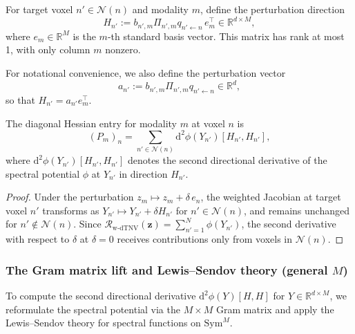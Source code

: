 \begin{definition}
For target voxel $n' \in \mathcal{N}(n)$ and modality $m$, define the perturbation direction
\begin{equation}
H_{n'} := b_{n',m} \Pi_{n',m} q_{n' \leftarrow n} \, e_m^\top \in \mathbb{R}^{d \times M},
\end{equation}
where $e_m \in \mathbb{R}^M$ is the $m$-th standard basis vector. This matrix has rank at most 1, with only column $m$ nonzero.
\end{definition}

For notational convenience, we also define the perturbation vector
\begin{equation}
a_{n'} := b_{n',m} \Pi_{n',m} q_{n' \leftarrow n} \in \mathbb{R}^d,
\end{equation}
so that $H_{n'} = a_{n'} e_m^\top$.

\begin{theorem}
\label{thm:diagonal_stencil_sum}
The diagonal Hessian entry for modality $m$ at voxel $n$ is
\begin{equation}
(P_m)_n = \sum_{n' \in \mathcal{N}(n)} \mathrm{d}^2 \phi(Y_{n'})[H_{n'}, H_{n'}],
\end{equation}
where $\mathrm{d}^2 \phi(Y_{n'})[H_{n'}, H_{n'}]$ denotes the second directional derivative of the spectral potential $\phi$ at $Y_{n'}$ in direction $H_{n'}$.
\end{theorem}

\begin{proof}
Under the perturbation $z_m \mapsto z_m + \delta\, e_n$, the weighted Jacobian at target voxel $n'$ transforms as $Y_{n'} \mapsto Y_{n'} + \delta H_{n'}$ for $n' \in \mathcal{N}(n)$, and remains unchanged for $n' \notin \mathcal{N}(n)$. Since $\mathcal{R}_{\mathrm{w\text{-}dTNV}}(\bm{z}) = \sum_{n'=1}^N \phi(Y_{n'})$, the second derivative with respect to $\delta$ at $\delta = 0$ receives contributions only from voxels in $\mathcal{N}(n)$.
\end{proof}

\subsubsection{The Gram matrix lift and Lewis--Sendov theory (general $M$)}

To compute the second directional derivative $\mathrm{d}^2 \phi(Y)[H, H]$ for $Y\in\mathbb{R}^{d\times M}$, we reformulate the spectral potential via the $M\times M$ Gram matrix and apply the Lewis--Sendov theory for spectral functions on $\mathrm{Sym}^M$.

